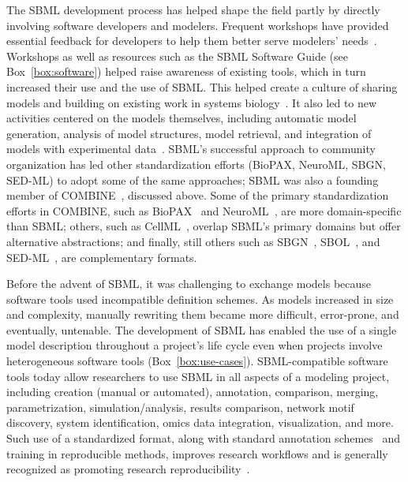 \documentclass{sbml-paper}
\begin{document}
The SBML development process has helped shape the field partly by directly involving software developers and modelers.  Frequent workshops have provided essential feedback for developers to help them better serve modelers' needs~\citep[e.g.,][]{waltemath2014meeting}.  Workshops as well as resources such as the SBML Software Guide (see Box~\ref{box:software}) helped raise awareness of existing tools, which in turn increased their use and the use of SBML.  This helped create a culture of sharing models and building on existing work in systems biology~\citep{stanford2015evolution}.  It also led to new activities centered on the models themselves, including automatic model generation, analysis of model structures, model retrieval, and integration of models with experimental data~\citep{Draeger2014}.  SBML's successful approach to community organization has led other standardization efforts (\eg BioPAX, NeuroML, SBGN, SED-ML) to adopt some of the same approaches; SBML was also a founding member of COMBINE~\citep{Hucka2015promotinga}, discussed above.  Some of the primary standardization efforts in COMBINE, such as BioPAX~\citep{Demir2010} and NeuroML~\citep{Gleeson2010}, are more domain-specific than SBML; others, such as CellML~\citep{Lloyd2004-fd}, overlap SBML's primary domains but offer alternative abstractions; and finally, still others such as SBGN~\citep{VanIersel2012}, SBOL~\citep{Roehner2016}, and SED-ML~\citep{waltemath2011reproducible}, are complementary formats.

Before the advent of SBML, it was challenging to exchange models because software tools used incompatible definition schemes.  As models increased in size and complexity, manually rewriting them became more difficult, error-prone, and eventually, untenable.  The development of SBML has enabled the use of a single model description throughout a project's life cycle even when projects involve heterogeneous software tools (Box~\ref{box:use-cases}).  SBML-compatible software tools today allow researchers to use SBML in all aspects of a modeling project, including creation (manual or automated),  annotation, comparison, merging, parametrization, simulation/analysis, results comparison, network motif discovery, system identification, omics data integration, visualization, and more.  Such use of a standardized format, along with standard annotation schemes~\citep{Neal2019harmonizing} and training in reproducible methods, improves research workflows and is generally recognized as promoting research reproducibility~\citep{waltemath2016modeling}.
\end{document}

